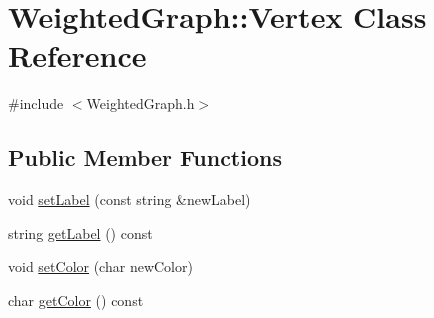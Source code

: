 \hypertarget{class_weighted_graph_1_1_vertex}{\section{Weighted\-Graph\-:\-:Vertex Class Reference}
\label{class_weighted_graph_1_1_vertex}
}


{\ttfamily \#include $<$Weighted\-Graph.\-h$>$}

\subsection*{Public Member Functions}
\begin{DoxyCompactItemize}
\item 
void \hyperlink{class_weighted_graph_1_1_vertex_afeacbff508350a8d2142369cc0ee09ba}{set\-Label} (const string \&new\-Label)
\item 
string \hyperlink{class_weighted_graph_1_1_vertex_a09bc4b28b77ed88f70df2438eecb1990}{get\-Label} () const 
\item 
void \hyperlink{class_weighted_graph_1_1_vertex_ac4fcd685324729f5956640cad824caad}{set\-Color} (char new\-Color)
\item 
char \hyperlink{class_weighted_graph_1_1_vertex_a4b10c5c1a23bc100385c33b9a40a65eb}{get\-Color} () const 
\end{DoxyCompactItemize}


